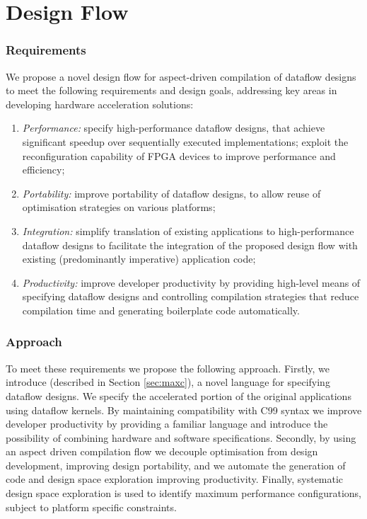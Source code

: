 \chapter{Design Flow}
\label{sec:design-flow}

\subsection{Requirements}

We propose a novel design flow for aspect-driven compilation of
dataflow designs to meet the following requirements and design goals,
addressing key areas in developing hardware acceleration solutions:
\begin{enumerate}
\item \emph{Performance:} specify high-performance dataflow designs,
  that achieve significant speedup over sequentially executed
  implementations; exploit the reconfiguration capability of FPGA
  devices to improve performance and efficiency;
\item \emph{Portability:} improve portability of dataflow designs, to
  allow reuse of optimisation strategies on various platforms;
\item \emph{Integration:} simplify translation of existing
  applications to high-performance dataflow designs to facilitate the
  integration of the proposed design flow with existing (predominantly
  imperative) application code;
\item \emph{Productivity:} improve developer productivity by providing
  high-level means of specifying dataflow designs and controlling
  compilation strategies that reduce compilation time and generating
  boilerplate code automatically.
\end{enumerate}

\subsection{Approach}
To meet these requirements we propose the following approach. Firstly,
we introduce \FAST{} (described in Section \ref{sec:maxc}), a novel
language for specifying dataflow designs. We specify the accelerated
portion of the original applications using \FAST{} dataflow
kernels. By maintaining compatibility with C99 syntax we improve
developer productivity by providing a familiar language and introduce
the possibility of combining hardware and software
specifications. Secondly, by using an aspect driven compilation flow
we decouple optimisation from design development, improving design
portability, and we automate the generation of code and design space
exploration improving productivity. Finally, systematic design space
exploration is used to identify maximum performance configurations,
subject to platform specific constraints.


